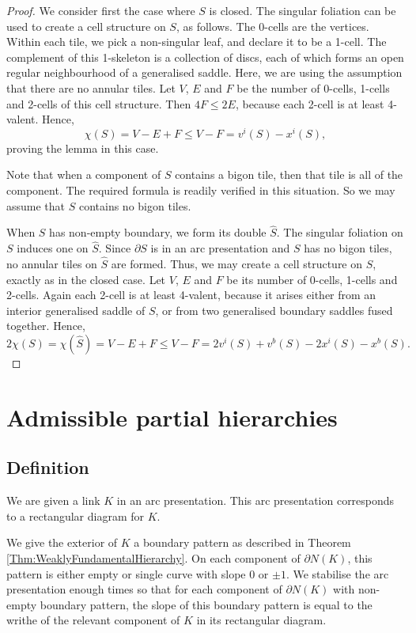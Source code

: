\documentclass[oneside]{amsart}
\numberwithin{equation}{section}
\theoremstyle{plain}
\theoremstyle{definition}
\begin{document}
\begin{proof}
We consider first the case where $S$ is closed. The singular foliation can be used 
to create a cell structure on $S$, as follows. The 0-cells are the vertices. Within each tile,
we pick a non-singular leaf, and declare it to be a 1-cell. The complement of this 1-skeleton
is a collection of discs, each of which forms an open regular neighbourhood of a generalised saddle.
Here, we are using the assumption that there are no annular tiles. Let $V$, $E$ and $F$
be the number of 0-cells, 1-cells and 2-cells of this cell structure. Then $4F \leq 2E$,
because each 2-cell is at least 4-valent. Hence,
$$\chi(S) = V - E + F \leq V - F = v^i(S) - x^i(S),$$
proving the lemma in this case.

Note that when a component of $S$ contains a bigon tile, then that tile
is all of the component. The required formula is readily verified in this situation.
So we may assume that $S$ contains no bigon tiles.

When $S$ has non-empty boundary, we form its double $\hat S$. The singular foliation
on $S$ induces one on $\hat S$. Since $\partial S$ is in an arc presentation and $S$ has no bigon tiles, no annular
tiles on $\hat S$ are formed. Thus, we may create a cell structure on $\hat S$, exactly
as in the closed case. Let $V$, $E$ and $F$ be its number of 0-cells, 1-cells and 2-cells.
Again each 2-cell is at least 4-valent, because it arises either from an interior generalised saddle of $S$,
or from two generalised boundary saddles fused together. Hence,
$$2 \chi(S) = \chi(\hat S) = V - E + F \leq V - F = 2v^i(S) + v^b(S) - 2x^i(S) - x^b(S).$$
\end{proof}

\section{Admissible partial hierarchies}
\label{Sec:AdmissibleHierarchies}

\subsection{Definition}

We are given a link $K$ in an arc presentation. This arc presentation corresponds to a rectangular diagram for $K$.

We give the exterior of $K$ a boundary pattern
as described in Theorem \ref{Thm:WeaklyFundamentalHierarchy}. On each component of $\partial N(K)$,
this pattern is either empty or single curve with slope $0$ or $\pm 1$.
We stabilise the arc presentation enough times so that for each component of $\partial N(K)$
with non-empty boundary pattern, the slope of this boundary pattern is equal to the writhe of the
relevant component of $K$ in its rectangular diagram.
\end{document}
